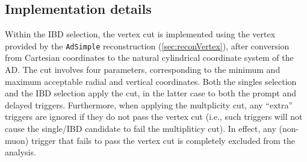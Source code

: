 \documentclass[../thesis.tex]{subfiles}
\begin{document}
\subsection{Implementation details}
\label{sec:cutVaryVtxCutImplDet}

Within the IBD selection, the vertex cut is implemented using the vertex provided by the \texttt{AdSimple} reconstruction (\autoref{sec:reconVertex}), after conversion from Cartesian coordinates to the natural cylindrical coordinate system of the AD. The cut involves four parameters, corresponding to the minimum and maximum acceptable radial and vertical coordinates. Both the singles selection and the IBD selection apply the cut, in the latter case to both the prompt and delayed triggers. Furthermore, when applying the multplicity cut, any ``extra'' triggers are ignored if they do not pass the vertex cut (i.e., such triggers will not cause the single/IBD candidate to fail the multipliticy cut). In effect, any (non-muon) trigger that fails to pass the vertex cut is completely excluded from the analysis.

\begin{comment}
Before going into the details of the efficiency calculation, it is worthwhile to demonstrate \emph{why} it is worthwhile to carry it out in the first place. First, we must define some vertex cuts to investigate. \autoref{tab:cutVaryVtxCutCutsTbl} lists five cuts along with the names we will use when referring to them in the remainder of this chapter. Using those definitions, Fig.~XXX shows the best-fit oscillation parameters obtained when applying these cuts without any efficiency correction. We expect some scatter, given that we are analyzing statistically independent subsamples.\footnote{More precisely, the three vertical cuts are statistically independent from each other, and likewise for the two radial cuts, but there \emph{is} a degree of overlap between each vertical and each radial cut. The overall point remains, however.}. Since we know that roughly half of the fit's uncertainty comes from statistics (as discussed in XXX fitting chapter), and since the vertical (radial) cuts approximately divide the sample into thirds (halves), we can estimate the statistical uncertainty on each subsample to be between $0.5\sqrt{2}$ and $0.5\sqrt{3}$ of the total (full sample statistical + systematic) uncertainty, i.e. 70--85\% of the total error bar. From Fig~XXX, it is apparent that the scale of the scatter is slightly larger than 1$\sigma$. While a mere statistical fluctuation cannot be ruled out, this result suggests that we should attempt to determine whether an AD-dependent efficiency variation may be playing a role (in which case a correction should be applied). As we will shortly show, when we measure the vertex efficiency, we do in fact find different values among the ADs, and applying a correction indeed reduces the scatter between the fit results.
\end{comment}
\end{document}
